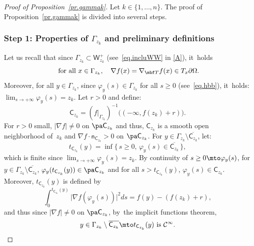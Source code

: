 \label{sec:gammak}

\begin{proof}[Proof of Proposition~\ref{pr.gammak}]
Let $k\in \{1,\ldots,n\}$.
The proof of Proposition~\ref{pr.gammak} is divided into several steps.

\subsubsection*{Step 1: Properties of $\Gamma_{z_k}$ and preliminary definitions}
Let us recall that since $\Gamma_{z_k}\subset \mathsf W_{z_k}^+$ (see~\eqref{eq.incluWW} in \ref{A}), it~holds
\[
\text{ for all } x\in \Gamma_{z_k}, \quad \nabla f(x)=\nabla_{\mbf T}f(x) \in T_x\partial \Omega.
\]
Moreover, for all $y\in \Gamma_{z_k}$, since $\varphi_y(s)\in \Gamma_{z_k}$ for all $s\ge 0$ (see~\eqref{eq.hbb}), it~holds: $\lim_{s\to +\infty}\varphi_y(s)=z_k$.
Let $r>0$ and define:
\[
\mathsf C_{z_k} =(f|_{\Gamma_{z_k}})^{-1}\bigl((-\infty, f(z_k)+r)\bigr).
\]
For $r>0$ small, $\vert \nabla f\vert \neq 0$ on $\pa \mathsf C_{z_k}$ and thus, ${\mathsf C_{z_k}}$ is a smooth open neighborhood of~$z_k$ and $\nabla f \cdot \mathsf n_{\mathsf C_{z_k}}>0$ on $\pa \mathsf C_{z_k}$. For $y\in \Gamma_{z_k}\setminus \overline{ \mathsf C_{z_k} }$, let:
\begin{equation}\label{eq.sinf}
t_{\mathsf C_{z_k}}(y)=\inf\{\, s\ge 0, \, \varphi_{y}(s)\in \overline{\mathsf C_{z_k}}\, \},
\end{equation}
which is finite since $\lim_{s\to +\infty}\varphi_y(s)=z_k$.
By continuity of $s\ge 0\mto \varphi_y(s)$, for $y\in \Gamma_{z_k}\setminus \overline{ \mathsf C_{z_k} }$, $\varphi_y(t_{\mathsf C_{z_k}}(y))\in \pa \mathsf C_{z_k}$ and for all $s> t_{\mathsf C_{z_k}}(y)$, $\varphi_y(s)\in \mathsf C_{z_k}$. Moreover, $t_{\mathsf C_{z_k}}(y)$ is defined by
\[
\int_0^{t_{\mathsf C_{z_k}}(y)} \vert \nabla f(\varphi_y(s))\vert^2ds= f(y)-(f(z_k)+r),
\]
and thus since $\vert \nabla f\vert \neq 0$ on $\pa \mathsf C_{z_k}$, by~the implicit functions theorem,
\begin{equation}\label{eq.sinfregularite}
y\in \Gamma_{z_k} \setminus \overline{ \mathsf C_{z_k} } \mto t_{\mathsf C_{z_k}}(y) \text{ is } \mathcal C^\infty.
\end{equation}


\end{proof}
